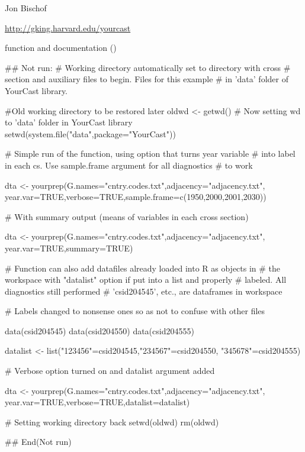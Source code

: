 %
\begin{Author}\relax
Jon Bischof 
\end{Author}
%
\begin{References}\relax
\url{http://gking.harvard.edu/yourcast}
\end{References}
%
\begin{SeeAlso}\relax
{} function and documentation
()
\end{SeeAlso}
%
\begin{Examples}
\begin{ExampleCode}
## Not run: 
# Working directory automatically set to directory with cross
# section and auxiliary files to begin. Files for this example
# in 'data' folder of YourCast library.

#Old working directory to be restored later
oldwd <- getwd()
# Now setting wd to 'data' folder in YourCast library
setwd(system.file("data",package="YourCast"))

# Simple run of the function, using option that turns year variable
# into label in each cs. Use sample.frame argument for all diagnostics
# to work
 
dta <- yourprep(G.names="cntry.codes.txt",adjacency="adjacency.txt",
year.var=TRUE,verbose=TRUE,sample.frame=c(1950,2000,2001,2030))


# With summary output (means of variables in each cross section) 


dta <- yourprep(G.names="cntry.codes.txt",adjacency="adjacency.txt",
year.var=TRUE,summary=TRUE)


# Function can also add datafiles already loaded into R as objects in
# the workspace with "datalist" option if put into a list and properly
# labeled. All diagnostics still performed 
# 'csid204545', etc., are dataframes in workspace

# Labels changed to nonsense ones so as not to confuse with other files

data(csid204545)
data(csid204550)
data(csid204555)

datalist <- list("123456"=csid204545,"234567"=csid204550,
"345678"=csid204555) 

# Verbose option turned on and datalist argument added 

dta <- yourprep(G.names="cntry.codes.txt",adjacency="adjacency.txt",
year.var=TRUE,verbose=TRUE,datalist=datalist)

# Setting working directory back
setwd(oldwd)
rm(oldwd)

## End(Not run)
\end{ExampleCode}
\end{Examples}
